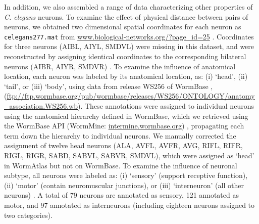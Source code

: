 \documentclass[10pt,letterpaper]{article}
\begin{document}
In addition, we also assembled a range of data characterizing other properties of \emph{C. elegans} neurons.
To examine the effect of physical distance between pairs of neurons, we obtained two dimensional spatial coordinates for each neuron as \texttt{celegans277.mat} from \url{www.biological-networks.org/?page_id=25} \cite{choe2004network}.
Coordinates for three neurons (AIBL, AIYL, SMDVL) were missing in this dataset, and were reconstructed by assigning identical coordinates to the corresponding bilateral neurons (AIBR, AIYR, SMDVR) \cite{Varier2011}.
To examine the influence of anatomical location, each neuron was labeled by its anatomical location, as:
(i) `head', (ii) `tail', or (iii) `body', using data from release WS256 of WormBase \cite{Harris:2009kd}, (\url{ftp://ftp.wormbase.org/pub/wormbase/releases/WS256/ONTOLOGY/anatomy_association.WS256.wb}).
These annotations were assigned to individual neurons using the anatomical hierarchy defined in WormBase, which we retrieved using the WormBase API (WormMine: \url{intermine.wormbase.org}) \cite{Harris:2009kd}, propagating each term down the hierarchy to individual neurons.
We manually corrected the assignment of twelve head neurons (ALA, AVFL, AVFR, AVG, RIFL, RIFR, RIGL, RIGR, SABD, SABVL, SABVR, SMDVL), which were assigned as `head' in WormAtlas \cite{WormAtlas} but not on WormBase.
To examine the influence of neuronal subtype, all neurons were labeled as:
(i) `sensory' (support receptive function),
(ii) `motor' (contain neuromuscular junctions), or
(iii) `interneuron' (all other neurons) \cite{White:1986tx}.
A total of 79 neurons are annotated as sensory, 121 annotated as motor, and 97 annotated as interneurons (including eighteen neurons assigned to two categories).
\end{document}
